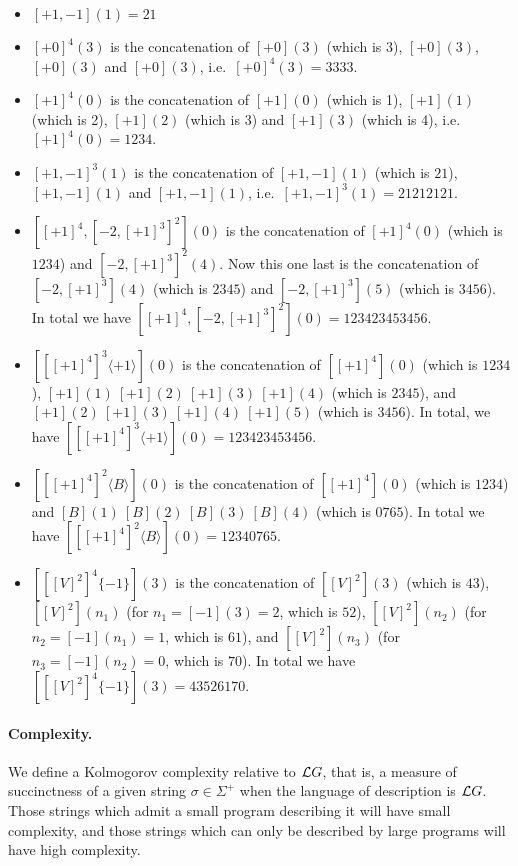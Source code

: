 \begin{itemize}
\item $[+1,-1](1)=21$

\item $[+0]^4(3)$ is the concatenation of $[+0](3)$ (which is $3$), $[+0](3)$, $[+0](3)$ and $[+0](3)$, i.e.\ $[+0]^4(3)=3333$.

\item $[+1]^4(0)$ is the concatenation of $[+1](0)$ (which is 1), $[+1](1)$ (which is 2), $[+1](2)$ (which is 3) and $[+1](3)$ (which is 4), i.e.\ $[+1]^4(0)=1234$.

\item $[+1,-1]^3(1)$ is the concatenation of $[+1,-1](1)$ (which is $21$), $[+1,-1](1)$ and  $[+1,-1](1)$, i.e.\  $[+1,-1]^3(1)=21212121$.

\item $[[+1]^4,[-2,[+1]^3]^2](0)$ is the concatenation of $[+1]^4(0)$ (which is $1234$) and $[-2,[+1]^3]^2(4)$. Now this one last is the concatenation of $[-2,[+1]^3](4)$ (which is $2345$) and $[-2,[+1]^3](5)$ (which is $3456$). In total we have $[[+1]^4,[-2,[+1]^3]^2](0)=123423453456$.

\item $[[[+1]^4]^3\langle +1\rangle ](0)$ is the concatenation of $[[+1]^4](0)$ (which is $1234$), $[+1](1)\ [+1](2)\ [+1](3)\ [+1](4)$ (which is $2345$), and $[+1](2)\ [+1](3)\ [+1](4)\ [+1](5)$ (which is $3456$). In total, we have $[[[+1]^4]^3\langle +1\rangle ](0) = 123423453456$.

\item $[[[+1]^4]^2\langle B\rangle](0)$ is the concatenation of $[[+1]^4](0)$ (which is $1234$) and $[B](1)\ [B](2)\ [B](3)\ [B](4)$ (which is $0765$). In total we have $[[[+1]^4]^2\langle B\rangle](0) = 12340765$.

\item $[[[V]^2]^4\{-1\}] (3)$ is the concatenation of $[[V]^2](3)$ (which is $43$), $[[V]^2](n_1)$ (for $n_1=[-1](3)=2$, which is $52$), $[[V]^2](n_2)$ (for $n_2=[-1](n_1)=1$, which is $61$), and $[[V]^2](n_3)$ (for $n_3=[-1](n_2)=0$, which is $70$). In total we have $[[[V]^2]^4\{-1\}] (3)= 43526170$.
\end{itemize}


\paragraph{Complexity.}
We define a Kolmogorov complexity relative to $\mathcal{L}G$, that is, a measure of succinctness of a given string $\sigma\in\Sigma^+$ when the language of description is $\mathcal{L}G$. Those strings which admit a small program describing it will have small complexity, and those strings which can only be described by large programs will have high complexity.

